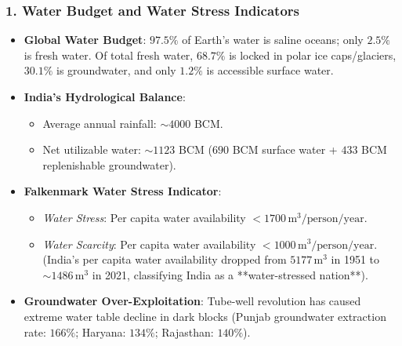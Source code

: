 \documentclass[11pt,a4paper]{article}
\begin{document}
\subsubsection{1. Water Budget and Water Stress Indicators}
\begin{itemize}[leftmargin=*]
  \item \textbf{Global Water Budget}: $97.5\%$ of Earth's water is saline oceans; only $2.5\%$ is fresh water. Of total fresh water, $68.7\%$ is locked in polar ice caps/glaciers, $30.1\%$ is groundwater, and only $1.2\%$ is accessible surface water.
  \item \textbf{India's Hydrological Balance}:
  \begin{itemize}
    \item Average annual rainfall: $\sim 4000$ BCM.
    \item Net utilizable water: $\sim 1123$ BCM ($690$ BCM surface water + $433$ BCM replenishable groundwater).
  \end{itemize}
  \item \textbf{Falkenmark Water Stress Indicator}:
  \begin{itemize}
    \item \textit{Water Stress}: Per capita water availability $<1700\,\text{m}^3/\text{person/year}$.
    \item \textit{Water Scarcity}: Per capita water availability $<1000\,\text{m}^3/\text{person/year}$. (India's per capita water availability dropped from $5177\,\text{m}^3$ in 1951 to $\sim 1486\,\text{m}^3$ in 2021, classifying India as a **water-stressed nation**).
  \end{itemize}
  \item \textbf{Groundwater Over-Exploitation}: Tube-well revolution has caused extreme water table decline in dark blocks (Punjab groundwater extraction rate: $166\%$; Haryana: $134\%$; Rajasthan: $140\%$).
\end{itemize}
\end{document}

